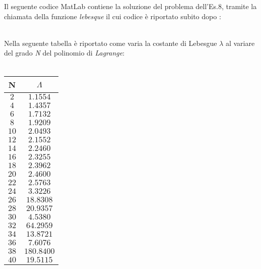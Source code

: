 Il seguente codice MatLab contiene la soluzione del problema dell'Es.8, tramite la chiamata della funzione \textit{lebesque} il cui codice è riportato subito dopo :\\\
	
	
Nella seguente tabella è riportato come varia la costante di Lebesgue $\lambda$
al variare del grado \textit{N} del polinomio di \textit{Lagrange}:\\\
	\begin{center}
		\begin{tabular}{|c|c|}
			\hline
				N & $\Lambda$ \\
    		\hline
    			$2$  & $1.1554$ \\ 
    			$4$  & $1.4357$ \\ 
    			$6$  & $1.7132$ \\ 
    			$8$  & $1.9209$ \\ 
    			$10$ & $2.0493$ \\ 
    			$12$ & $2.1552$ \\ 
    			$14$ & $2.2460$ \\ 
    			$16$ & $2.3255$ \\ 
   				$18$ & $2.3962$ \\ 
    			$20$ & $2.4600$ \\ 
    			$22$ & $2.5763$ \\ 
    			$24$ & $3.3226$ \\ 
    			$26$ & $18.8308$ \\ 
    			$28$ & $20.9357$ \\ 
    			$30$ & $4.5380$ \\ 
    			$32$ & $64.2959$ \\ 
    			$34$ & $13.8721$ \\ 
    			$36$ & $7.6076$ \\ 
    			$38$ & $180.8400$ \\ 
    			$40$ & $19.5115$ \\ 
			\hline
		\end{tabular}
	\end{center} 
